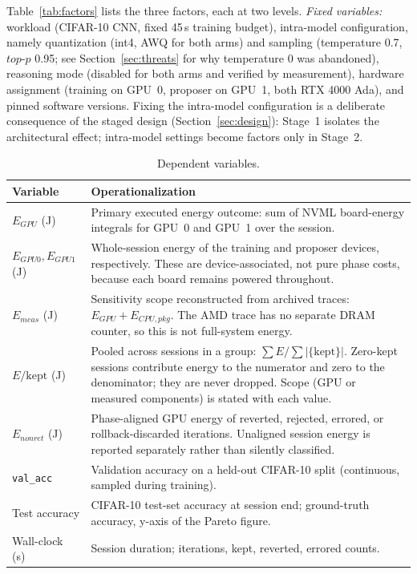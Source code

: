 Table~\ref{tab:factors} lists the three factors, each at two levels. \emph{Fixed variables:} workload (CIFAR-10 CNN, fixed 45\,s training budget), intra-model configuration, namely quantization (int4, AWQ for both arms) and sampling (temperature 0.7, $\mathit{top\text{-}p}$ 0.95; see Section~\ref{sec:threats} for why temperature 0 was abandoned), reasoning mode (disabled for both arms and verified by measurement), hardware assignment (training on GPU~0, proposer on GPU~1, both RTX 4000 Ada), and pinned software versions. Fixing the intra-model configuration is a deliberate consequence of the staged design (Section~\ref{sec:design}): Stage~1 isolates the architectural effect; intra-model settings become factors only in Stage~2.

\begin{table}[htbp]
\caption{Dependent variables.}
\label{tab:depvars}
\small
\begin{tabular}{p{2.6cm}p{5.2cm}}
\toprule
\textbf{Variable} & \textbf{Operationalization} \\
\midrule
$E_{\mathit{GPU}}$ (J) & Primary executed energy outcome: sum of NVML board-energy integrals for GPU~0 and GPU~1 over the session. \\
$E_{\mathit{GPU0}}, E_{\mathit{GPU1}}$ (J) & Whole-session energy of the training and proposer devices, respectively. These are device-associated, not pure phase costs, because each board remains powered throughout. \\
$E_{\mathit{meas}}$ (J) & Sensitivity scope reconstructed from archived traces: $E_{\mathit{GPU}}+E_{\mathit{CPU,pkg}}$. The AMD trace has no separate DRAM counter, so this is not full-system energy. \\
$E/\mathrm{kept}$ (J) & Pooled across sessions in a group: $\sum E / \sum |\{\text{kept}\}|$. Zero-kept sessions contribute energy to the numerator and zero to the denominator; they are never dropped. Scope (GPU or measured components) is stated with each value. \\
$E_{\mathit{nonret}}$ (J) & Phase-aligned GPU energy of reverted, rejected, errored, or rollback-discarded iterations. Unaligned session energy is reported separately rather than silently classified. \\
\texttt{val\_acc} & Validation accuracy on a held-out CIFAR-10 split (continuous, sampled during training). \\
Test accuracy & CIFAR-10 test-set accuracy at session end; ground-truth accuracy, y-axis of the Pareto figure. \\
Wall-clock (s) & Session duration; iterations, kept, reverted, errored counts. \\
\bottomrule
\end{tabular}
\end{table}

